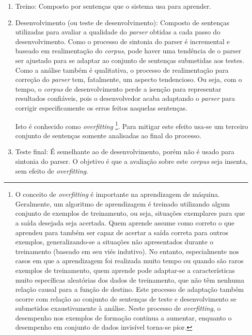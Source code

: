 \begin{enumerate}

\item{Treino: Composto por sentenças que o sistema usa para aprender.} %
\label{sub:treino}

\item{Desenvolvimento (ou teste de desenvolvimento): Composto de sentenças utilizadas para avaliar a qualidade do \emph{parser} obtidas a cada passo do desenvolvimento. Como o processo de sintonia do parser é incremental e baseado em realimentação do \emph{corpus}, pode haver uma tendência de o parser ser ajustado para se adaptar ao conjunto de sentenças submetidas aos testes. Como a análise também é qualitativa, o processo de realimentação para correção do \emph{parser} tem, fatalmente, um aspecto tendencioso. Ou seja, com o tempo, o \emph{corpus} de desenvolvimento perde a isenção para representar resultados confiáveis, pois o desenvolvedor acaba adaptando o \emph{parser} para corrigir especificamente os erros feitos naquelas sentenças. 

Isto é conhecido como \emph{overfitting} \footnote{O conceito de \emph{overfitting} \cite{everitt2002cambridge} é importante na aprendizagem de máquina. Geralmente, um algoritmo de aprendizagem é treinado utilizando algum conjunto de exemplos de treinamento, ou seja, situações exemplares para que a saída desejada seja acertada. Quem aprende assume como correto o que aprendeu para também ser capaz de acertar a saída correta para outros exemplos, generalizando-se a situações não apresentados durante o treinamento (baseado em seu viés indutivo). No entanto, especialmente nos casos em que a aprendizagem foi realizada muito tempo ou quando são raros exemplos de treinamento, quem aprende pode adaptar-se a características muito específicas aleatórias dos dados de treinamento, que não têm nenhuma relação causal para a função de destino. Este processo de adaptação também ocorre com relação ao conjunto de sentenças de teste e desenvolvimento se submetidos exaustivamente à análise. Neste processo de \emph{overfitting}, o desempenho nos exemplos de formação continua a aumentar, enquanto o desempenho em conjunto de dados invisível torna-se pior.}. Para mitigar este efeito usa-se um terceiro conjunto de sentenças somente analisadas ao final do processo.} 

\label{sub:desenvolvimento_ou_teste_de_desenvolvimento_}

\item{Teste final: É semelhante ao de desenvolvimento, porém não é usado para sintonia do parser. O objetivo é que a avaliação sobre este \emph{corpus} seja insenta, sem efeito de \emph{overfitting}.}
\label{sub:teste_final}
\end{enumerate}

